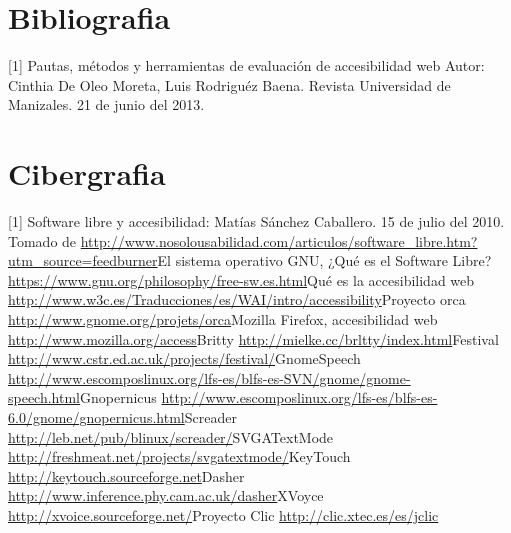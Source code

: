\documentclass[a4paper]{article}
\begin{document}
\section{Bibliografia}
[1]  Pautas, métodos y herramientas de evaluación de accesibilidad web Autor: Cinthia De Oleo Moreta, Luis Rodriguéz Baena. Revista Universidad de Manizales. 21 de junio del 2013.

\section{Cibergrafia}
[1] Software libre y accesibilidad: Matías Sánchez Caballero. 15 de julio del 2010. Tomado de  \url{http://www.nosolousabilidad.com/articulos/software_libre.htm?utm_source=feedburner}\newline
[2] El sistema operativo GNU, ¿Qué es el Software Libre? \url{https://www.gnu.org/philosophy/free-sw.es.html}\newline
[3] Qué es la accesibilidad web \url{http://www.w3c.es/Traducciones/es/WAI/intro/accessibility}\newline
[4] Proyecto orca \url{http://www.gnome.org/projets/orca}\newline
[5] Mozilla Firefox, accesibilidad web \url{http://www.mozilla.org/access}\newline
[6] Britty \url{http://mielke.cc/brltty/index.html}\newline
[7] Festival \url{http://www.cstr.ed.ac.uk/projects/festival/}\newline
[8] GnomeSpeech \url{http://www.escomposlinux.org/lfs-es/blfs-es-SVN/gnome/gnome-speech.html}\newline
[9] Gnopernicus \url{http://www.escomposlinux.org/lfs-es/blfs-es-6.0/gnome/gnopernicus.html}\newline
[10] Screader \url{http://leb.net/pub/blinux/screader/}\newline
[11] SVGATextMode \url{http://freshmeat.net/projects/svgatextmode/}\newline
[12] KeyTouch \url{http://keytouch.sourceforge.net}\newline
[13] Dasher \url{http://www.inference.phy.cam.ac.uk/dasher}\newline
[14] XVoyce \url{http://xvoice.sourceforge.net/}\newline
[15] Proyecto Clic \url{http://clic.xtec.es/es/jclic}
\end{document}
